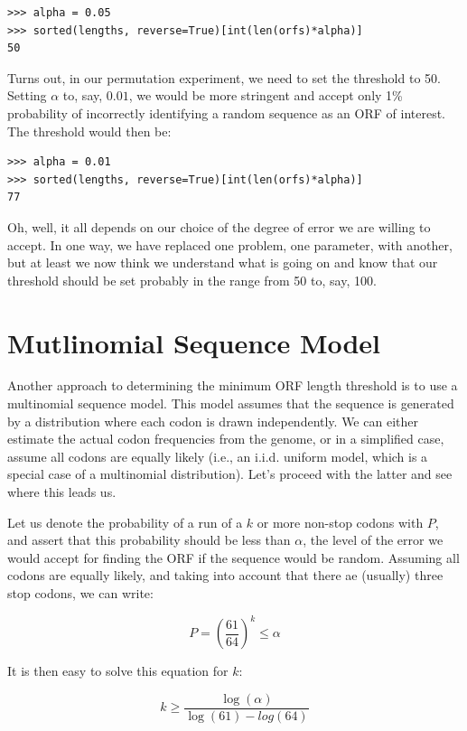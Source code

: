 \vspace*{3mm}
\begin{lstlisting}
>>> alpha = 0.05
>>> sorted(lengths, reverse=True)[int(len(orfs)*alpha)]
50
\end{lstlisting}

Turns out, in our permutation experiment, we need to set the threshold to 50. Setting $\alpha$ to, say, $0.01$, we would be more stringent and accept only 1\% probability of incorrectly identifying a random sequence as an ORF of interest. The threshold would then be:

\vspace*{3mm}
\begin{lstlisting}
>>> alpha = 0.01
>>> sorted(lengths, reverse=True)[int(len(orfs)*alpha)]
77
\end{lstlisting}

Oh, well, it all depends on our choice of the degree of error we are willing to accept. In one way, we have replaced one problem, one parameter, with another, but at least we now think we understand what is going on and know that our threshold should be set probably in the range from 50 to, say, 100.

\section{Mutlinomial Sequence Model}

Another approach to determining the minimum ORF length threshold is to use a multinomial sequence model. This model assumes that the sequence is generated by a distribution where each codon is drawn independently. We can either estimate the actual codon frequencies from the genome, or in a simplified case, assume all codons are equally likely (i.e., an i.i.d. uniform model, which is a special case of a multinomial distribution). Let's proceed with the latter and see where this leads us.

Let us denote the probability of a run of a $k$ or more non-stop codons with $P$, and assert that this probability should be less than $\alpha$, the level of the error we would accept for finding the ORF if the sequence would be random. Assuming all codons are equally likely, and taking into account that there ae (usually) three stop codons, we can write:

$$ P = \left(\frac{61}{64}\right)^k \leq \alpha  $$

It is then easy to solve this equation for $k$:

$$ k \geq \frac{\log(\alpha)}{\log(61) - log(64)} $$

